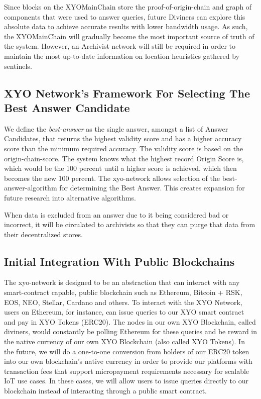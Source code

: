 \documentclass{article}
\begin{document}
Since blocks on the XYOMainChain store the \Gls{proof-of-origin-chain} and graph of components that were used to answer queries, future Diviners can explore this absolute data to achieve accurate results with lower bandwidth usage. As such, the XYOMainChain will gradually become the most important source of truth of the system. However, an Archivist network will still be required in order to maintain the most up-to-date information on location \glspl{heuristic} gathered by \Glspl{sentinel}.

\subsection{XYO Network’s Framework For Selecting The Best Answer Candidate}

We define the \textit{\Gls{best-answer}} as the single answer, amongst a list of Answer Candidates, that returns the highest validity score and has a higher \gls{accuracy} score than the minimum required accuracy. The validity score is based on the \Gls{origin-chain-score}. The system knows what the highest record Origin Score is, which would be the 100 percent until a higher score is achieved, which then becomes the new 100 percent. The \Gls{xyo-network} allows selection of the \Gls{best-answer-algorithm} for determining the Best Answer. This creates expansion for future research into alternative algorithms.

When data is excluded from an answer due to it being considered bad or incorrect, it will be circulated to archivists so that they can purge that data from their decentralized stores.

\subsection{Initial Integration With Public Blockchains}

The \Gls{xyo-network} is designed to be an abstraction that can interact with any \gls{smart-contract} capable, public blockchain such as Ethereum, Bitcoin + RSK, EOS, NEO, Stellar, Cardano and others. To interact with the XYO Network, users on Ethereum, for instance, can issue queries to our XYO smart contract and pay in XYO Tokens (ERC20). The nodes in our own XYO Blockchain, called \Glspl{diviner}, would constantly be polling Ethereum for these queries and be reward in the native currency of our own XYO Blockchain (also called XYO Tokens). In the future, we will do a one-to-one conversion from holders of our ERC20 token into our own blockchain's native currency in order to provide our platforms with transaction fees that support micropayment requirements necessary for scalable IoT use cases. In these cases, we will allow users to issue queries directly to our blockchain instead of interacting through a public smart contract.
\end{document}
